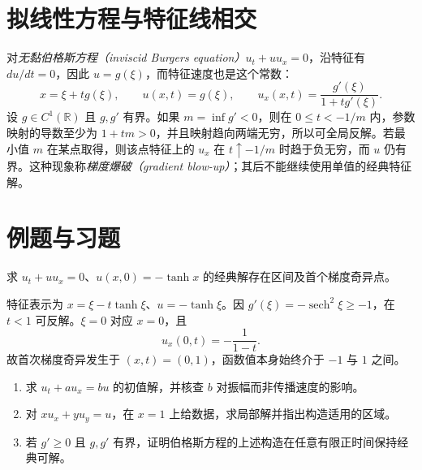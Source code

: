 \section{拟线性方程与特征线相交}
对\emph{无黏伯格斯方程（inviscid Burgers equation）}$u_t+u u_x=0$，沿特征有 $du/dt=0$，因此 $u=g(\xi)$，而特征速度也是这个常数：
\begin{equation}
 x=\xi+t g(\xi),\qquad u(x,t)=g(\xi),\qquad
 u_x(x,t)=\frac{g'(\xi)}{1+t g'(\xi)}.
 \label{eq:burgers-characteristic}
\end{equation}
设 $g\in C^1(\mathbb R)$ 且 $g,g'$ 有界。如果 $m=\inf g'<0$，则在 $0\le t<-1/m$ 内，参数映射的导数至少为 $1+tm>0$，并且映射趋向两端无穷，所以可全局反解。若最小值 $m$ 在某点取得，则该点特征上的 $u_x$ 在 $t\uparrow-1/m$ 时趋于负无穷，而 $u$ 仍有界。这种现象称\emph{梯度爆破（gradient blow-up）}；其后不能继续使用单值的经典特征解。

\section{例题与习题}
\begin{example}
求 $u_t+u u_x=0$、$u(x,0)=-\tanh x$ 的经典解存在区间及首个梯度奇异点。
\end{example}
\begin{solve}
特征表示为 $x=\xi-t\tanh\xi$、$u=-\tanh\xi$。因 $g'(\xi)=-\operatorname{sech}^2\xi\ge-1$，在 $t<1$ 可反解。$\xi=0$ 对应 $x=0$，且
\[
 u_x(0,t)=-\frac1{1-t}.
\]
故首次梯度奇异发生于 $(x,t)=(0,1)$，函数值本身始终介于 $-1$ 与 $1$ 之间。
\end{solve}
\begin{enumerate}
 \item 求 $u_t+a u_x=b u$ 的初值解，并核查 $b$ 对振幅而非传播速度的影响。
 \item 对 $x u_x+y u_y=u$，在 $x=1$ 上给数据，求局部解并指出构造适用的区域。
 \item 若 $g'\ge0$ 且 $g,g'$ 有界，证明伯格斯方程的上述构造在任意有限正时间保持经典可解。
\end{enumerate}

